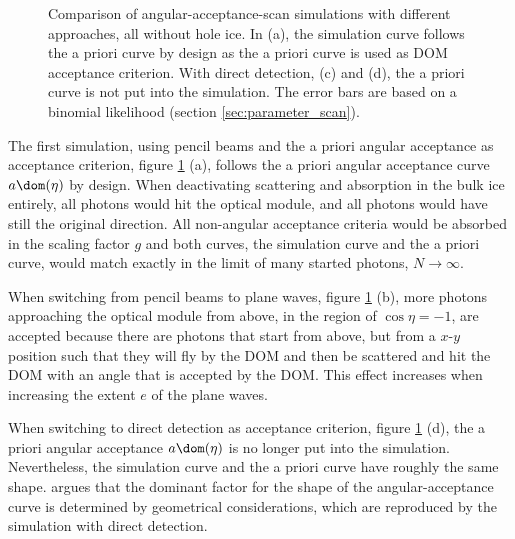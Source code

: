 \begin{figure}[htbp]
  \hfill
  \hfill
  \hfill
  \caption{Comparison of angular-acceptance-scan simulations with different approaches, all without hole ice. In (a), the simulation curve follows the a priori curve by design as the a priori curve is used as DOM acceptance criterion. With direct detection, (c) and (d), the a priori curve is not put into the simulation. The error bars are based on a binomial likelihood (section \ref{sec:parameter_scan}).}
  \label{fig:Shai8yah}
\end{figure}

The first simulation, using pencil beams and the a priori angular acceptance as acceptance criterion, figure \ref{fig:Shai8yah} (a), follows the a priori angular acceptance curve $a\dom(\eta)$ by design. When deactivating scattering and absorption in the bulk ice entirely, all photons would hit the optical module, and all photons would have still the original direction. All non-angular acceptance criteria would be absorbed in the scaling factor $g$ and both curves, the simulation curve and the a priori curve, would match exactly in the limit of many started photons, $N\rightarrow\infty$.

When switching from pencil beams to plane waves, figure \ref{fig:Shai8yah} (b), more photons approaching the optical module from above, in the region of $\cos \eta = -1$, are accepted because there are photons that start from above, but from a $x$-$y$ position such that they will fly by the DOM and then be scattered and hit the DOM with an angle that is accepted by the DOM. This effect increases when increasing the extent $e$ of the plane waves.


When switching to direct detection as acceptance criterion, figure \ref{fig:Shai8yah} (d), the a priori angular acceptance $a\dom(\eta)$ is no longer put into the simulation. Nevertheless, the simulation curve and the a priori curve have roughly the same shape. \rongen \cite{martindardupdate} argues that the dominant factor for the shape of the angular-acceptance curve is determined by geometrical considerations, which are reproduced by the simulation with direct detection.

